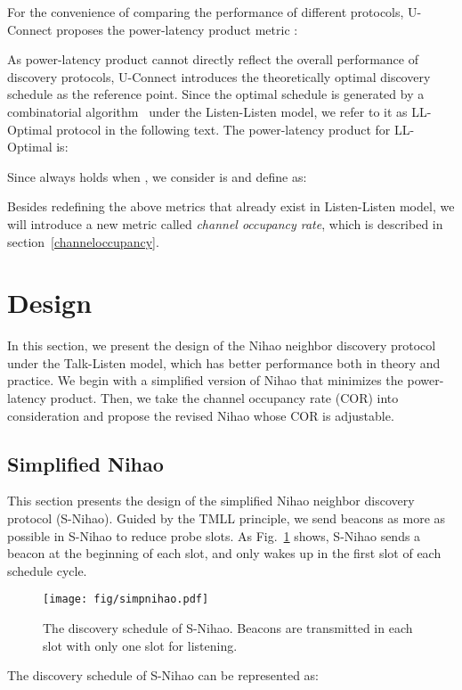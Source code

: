 \documentclass[conference]{IEEEtran}
\begin{document}
For the convenience of comparing the performance of different protocols, U-Connect proposes the power-latency product metric :


As power-latency product cannot directly reflect the overall performance of discovery protocols,
U-Connect introduces the theoretically optimal discovery schedule as the reference point.
Since the optimal schedule is generated by a combinatorial algorithm~\cite{zheng2003asynchronous} under the Listen-Listen model,
we refer to it as LL-Optimal protocol in the following text.
The power-latency product for LL-Optimal  is:

Since  always holds when ,
we consider  is  and define  as:


Besides redefining the above metrics that already exist in Listen-Listen model,
we will introduce a new metric called \emph{channel occupancy rate}, which is described in section~\ref{channeloccupancy}.

\section{Design}\label{design}
In this section, we present the design of the Nihao neighbor discovery protocol under the Talk-Listen model,
which has better performance both in theory and practice.
We begin with a simplified version of Nihao that minimizes the power-latency product.
Then, we take the channel occupancy rate (COR) into consideration and propose the revised Nihao whose COR is adjustable.

\subsection{Simplified Nihao}
This section presents the design of the simplified Nihao neighbor discovery protocol (S-Nihao).
Guided by the TMLL principle, we send beacons as more as possible in S-Nihao to reduce probe slots.
As Fig.~\ref{simpnihao} shows, S-Nihao sends a beacon at the beginning of each slot, and only wakes up in the first slot of each schedule cycle.

\begin{figure}[t]
    \centering
    \texttt{[image: fig/simpnihao.pdf]}
    \caption{The discovery schedule of S-Nihao. Beacons are transmitted in each slot with only one slot for listening.}\label{simpnihao}
\end{figure}

The discovery schedule of S-Nihao can be represented as:
\end{document}
